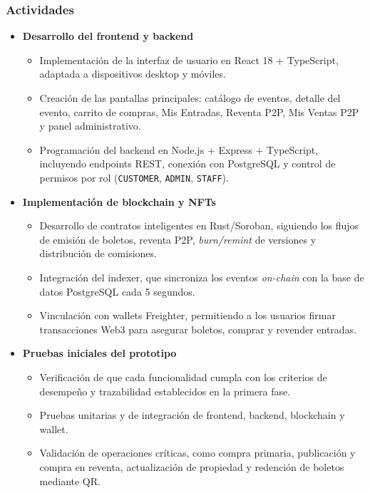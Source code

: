 \documentclass[12pt,a4paper]{article}
\begin{document}
\subsubsection{Actividades}
\begin{itemize}
    \item \textbf{Desarrollo del frontend y backend}
    \begin{itemize}
        \item Implementación de la interfaz de usuario en React 18 + TypeScript,
        adaptada a dispositivos desktop y móviles.
        \item Creación de las pantallas principales: catálogo de eventos, detalle
        del evento, carrito de compras, Mis Entradas, Reventa P2P, Mis Ventas P2P
        y panel administrativo.
        \item Programación del backend en Node.js + Express + TypeScript,
        incluyendo endpoints REST, conexión con PostgreSQL y control de permisos
        por rol (\texttt{CUSTOMER}, \texttt{ADMIN}, \texttt{STAFF}).
    \end{itemize}

    \item \textbf{Implementación de blockchain y NFTs}
    \begin{itemize}
        \item Desarrollo de contratos inteligentes en Rust/Soroban, siguiendo los
        flujos de emisión de boletos, reventa P2P, \textit{burn/remint} de
        versiones y distribución de comisiones.
        \item Integración del indexer, que sincroniza los eventos \textit{on-chain}
        con la base de datos PostgreSQL cada 5 segundos.
        \item Vinculación con wallets Freighter, permitiendo a los usuarios firmar
        transacciones Web3 para asegurar boletos, comprar y revender entradas.
    \end{itemize}

    \item \textbf{Pruebas iniciales del prototipo}
    \begin{itemize}
        \item Verificación de que cada funcionalidad cumpla con los criterios de
        desempeño y trazabilidad establecidos en la primera fase.
        \item Pruebas unitarias y de integración de frontend, backend, blockchain y
        wallet.
        \item Validación de operaciones críticas, como compra primaria, publicación
        y compra en reventa, actualización de propiedad y redención de boletos
        mediante QR.
    \end{itemize}


\end{itemize}
\end{document}
